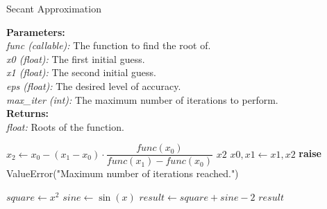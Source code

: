     \begin{algorithm}
    \caption{Secant Approximation}\label{Root Approximation}
      \begin{tabbing}
        \textbf{Parameters:}\\
          \hspace{1em}\textit{func (callable):} The function to find the root of.\\
          \hspace{1em}\textit{x0 (float):} The first initial guess.\\
          \hspace{1em}\textit{x1 (float):} The second initial guess.\\
          \hspace{1em}\textit{eps (float):} The desired level of accuracy.\\
          \hspace{1em}\textit{max\_iter (int):} The maximum number of iterations to perform.\\
          
        \textbf{Returns:}\\
          \hspace{1em}\textit{float:} Roots of the function.
      \end{tabbing}
      \vspace{1 em}
    \begin{algorithmic}[1]
          \State $x_2 \gets x_0 - (x_1 - x_0) \cdot \dfrac{func(x_0)}{func(x_1) - func(x_0)}$ 
            \State \Return $x2$
          \Else
            \State $x0, x1 \gets x1, x2$ 
          \EndIf
        \EndFor
        \State \textbf{raise} ValueError("Maximum number of iterations reached.")
      \EndFunction
      \end{algorithmic}
      \vspace{1 em}
      
      \begin{algorithmic}[1]
          \State $square \gets x^2$
          \State $sine \gets \sin(x)$
          \State $result \gets square + sine - 2$
          \State \Return $result$
        \EndFunction
      \end{algorithmic}      
    \end{algorithm}

